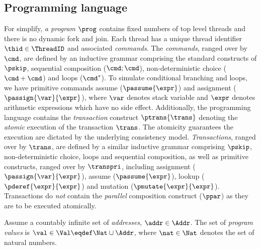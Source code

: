 \subsection{Programming language}

For simplify, \emph{a program} \( \prog \) contains fixed numbers of top level threads and there is no dynamic fork and join.
Each thread has a unique thread identifier \( \thid \in \ThreadID \) and associated \emph{commands}.
The \emph{commands}, ranged over by $\cmd$, are defined by an inductive grammar comprising the standard constructs of $\pskip$, sequential composition ($\cmd; \cmd$), non-deterministic choice ($\cmd+\cmd$) and loops ($\cmd^*$).
To simulate conditional branching and loops, we have primitive commands assume (\( \passume{\expr}\)) and assignment (\( \passign{\var}{\expr} \)), where \( \var \) denotes stack variable and \( \expr \) denotes arithmetic expressions which have no side effect.
Additionally, the programming language contains the \emph{transaction} construct $\ptrans{\trans}$ denoting the \emph{atomic} execution of the transaction $\trans$. 
The atomicity guarantees the execution are dictated by the underlying consistency model.
\emph{Transactions}, ranged over by $\trans$, are defined by a similar inductive grammar comprising $\pskip$, non-deterministic choice, loops and sequential composition, as well as primitive constructs, ranged over by \( \transpri \), including assignment (\( \passign{\var}{\expr}\)), assume (\( \passume{\expr}\)), lookup (\( \pderef{\expr}{\expr}\)) and mutation (\( \pmutate{\expr}{\expr}\)). 
Transactions do \emph{not} contain the \emph{parallel} composition construct ($\ppar$) as they are to be executed atomically.

\begin{defn}
\label{def:program_values}
Assume a countably infinite set of \emph{addresses}, $\addr \in \Addr$. The set of \emph{program values} is $\val \in \Val \eqdef \Nat \cup \Addr$, where $ \nat \in \Nat$ denotes the set of natural numbers.
\end{defn}

